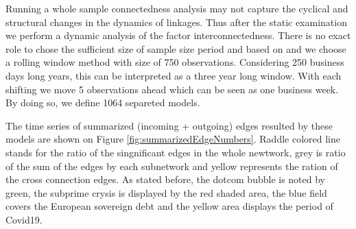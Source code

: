 \documentclass[12pt,bibliography=totoc]{article}
\begin{document}

Running a whole sample connectedness analysis may not capture the cyclical and structural changes in the dynamics of linkages. Thus after the static examination we perform a dynamic analysis of the factor interconnectedness. There is no exact role to chose the  sufficient size of sample size period and based on \cite{papana2017financial} and \cite{arce2013credit} we choose a rolling window method with size of 750 observations. Considering 250 business days long years, this can be interpreted as a three year long window. With each shifting we move 5 observations ahead which can be seen as one business week. By doing so, we define 1064 separeted models. 

The time series of summarized (incoming + outgoing) edges resulted by these models are shown on Figure \ref{fig:summarizedEdgeNumbers}. Raddle colored line stands for the ratio of the singnificant edges in the whole newtwork, grey is ratio of the sum of the edges by each subnetwork and yellow represents the ration of the cross connection edges. As stated before, the dotcom bubble is noted by green, the subprime crysis is displayed by the red shaded area, the blue field covers the European sovereign debt and the yellow area displays the period of Covid19.
\end{document}
